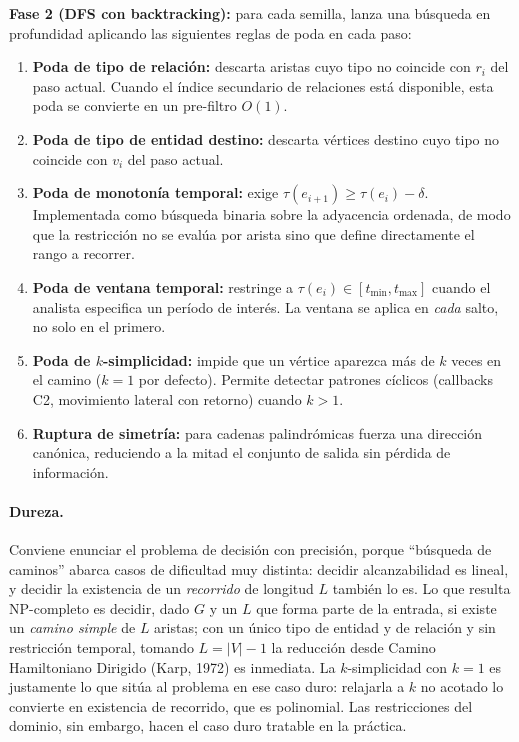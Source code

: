 \documentclass[11pt,a4paper]{article}
\begin{document}
\textbf{Fase 2 (DFS con backtracking):} para cada semilla, lanza una búsqueda
en profundidad aplicando las siguientes reglas de poda en cada paso:

\begin{enumerate}[leftmargin=*]
  \item \textbf{Poda de tipo de relación:} descarta aristas cuyo tipo no
  coincide con $r_i$ del paso actual. Cuando el índice secundario de relaciones
  está disponible, esta poda se convierte en un pre-filtro $O(1)$.
  \item \textbf{Poda de tipo de entidad destino:} descarta vértices destino
  cuyo tipo no coincide con $v_i$ del paso actual.
  \item \textbf{Poda de monotonía temporal:} exige
  $\tau(e_{i+1}) \geq \tau(e_i) - \delta$. Implementada como búsqueda binaria
  sobre la adyacencia ordenada, de modo que la restricción no se evalúa por
  arista sino que define directamente el rango a recorrer.
  \item \textbf{Poda de ventana temporal:} restringe a
  $\tau(e_i) \in [t_{\min}, t_{\max}]$ cuando el analista especifica un período
  de interés. La ventana se aplica en \emph{cada} salto, no solo en el primero.
  \item \textbf{Poda de $k$-simplicidad:} impide que un vértice aparezca más de
  $k$ veces en el camino ($k=1$ por defecto). Permite detectar patrones
  cíclicos (callbacks C2, movimiento lateral con retorno) cuando $k > 1$.
  \item \textbf{Ruptura de simetría:} para cadenas palindrómicas fuerza una
  dirección canónica, reduciendo a la mitad el conjunto de salida sin pérdida
  de información.
\end{enumerate}

\paragraph{Dureza.} Conviene enunciar el problema de decisión con precisión,
porque ``búsqueda de caminos'' abarca casos de dificultad muy distinta: decidir
alcanzabilidad es lineal, y decidir la existencia de un \emph{recorrido} de
longitud $L$ también lo es. Lo que resulta NP-completo es decidir, dado $G$ y
un $L$ que forma parte de la entrada, si existe un \emph{camino simple} de $L$
aristas; con un único tipo de entidad y de relación y sin restricción temporal,
tomando $L = |V| - 1$ la reducción desde Camino Hamiltoniano Dirigido (Karp,
1972) es inmediata. La $k$-simplicidad con $k = 1$ es justamente lo que sitúa
al problema en ese caso duro: relajarla a $k$ no acotado lo convierte en
existencia de recorrido, que es polinomial. Las restricciones del dominio, sin
embargo, hacen el caso duro tratable en la práctica.
\end{document}
